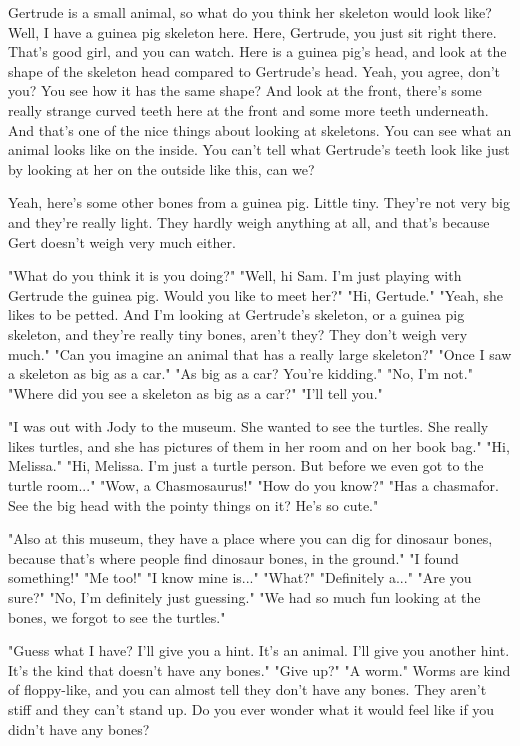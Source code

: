 Gertrude is a small animal, so what do you think her skeleton would look like? Well, I have a guinea pig skeleton here. Here, Gertrude, you just sit right there. That's good girl, and you can watch. Here is a guinea pig's head, and look at the shape of the skeleton head compared to Gertrude's head. Yeah, you agree, don't you? You see how it has the same shape? And look at the front, there's some really strange curved teeth here at the front and some more teeth underneath. And that's one of the nice things about looking at skeletons. You can see what an animal looks like on the inside. You can't tell what Gertrude's teeth look like just by looking at her on the outside like this, can we?

Yeah, here's some other bones from a guinea pig. Little tiny. They're not very big and they're really light. They hardly weigh anything at all, and that's because Gert doesn't weigh very much either.

"What do you think it is you doing?" "Well, hi Sam. I'm just playing with Gertrude the guinea pig. Would you like to meet her?" "Hi, Gertude." "Yeah, she likes to be petted. And I'm looking at Gertrude's skeleton, or a guinea pig skeleton, and they're really tiny bones, aren't they? They don't weigh very much." "Can you imagine an animal that has a really large skeleton?" "Once I saw a skeleton as big as a car." "As big as a car? You're kidding." "No, I'm not." "Where did you see a skeleton as big as a car?" "I'll tell you."

"I was out with Jody to the museum. She wanted to see the turtles. She really likes turtles, and she has pictures of them in her room and on her book bag." "Hi, Melissa." "Hi, Melissa. I'm just a turtle person. But before we even got to the turtle room..." "Wow, a Chasmosaurus!" "How do you know?" "Has a chasmafor. See the big head with the pointy things on it? He's so cute."

"Also at this museum, they have a place where you can dig for dinosaur bones, because that's where people find dinosaur bones, in the ground." "I found something!" "Me too!" "I know mine is..." "What?" "Definitely a..." "Are you sure?" "No, I'm definitely just guessing." "We had so much fun looking at the bones, we forgot to see the turtles."

"Guess what I have? I'll give you a hint. It's an animal. I'll give you another hint. It's the kind that doesn't have any bones." "Give up?" "A worm." Worms are kind of floppy-like, and you can almost tell they don't have any bones. They aren't stiff and they can't stand up. Do you ever wonder what it would feel like if you didn't have any bones?

